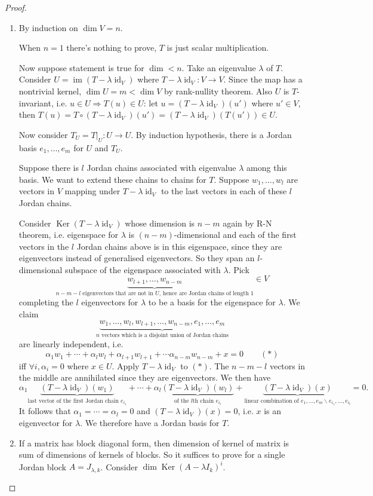 \documentclass[a4paper]{article}
\newcommand{\Ker}{\operatorname{Ker}}
\newcommand{\id}{\operatorname{id}}
\newcommand{\im}{\operatorname{im}}
\theoremstyle{definition}
\begin{document}
\begin{proof}
\begin{enumerate}
    \item By induction on $\dim V=n$.
    
    When $n=1$ there's nothing to prove, $T$ is just scalar multiplication.
    
    Now suppose statement is true for $\dim < n$. Take an eigenvalue $\lambda$ of $T$. Consider $U=\im (T-\lambda \id_V)$ where $T-\lambda \id_V:V\rightarrow V$. Since the map has a nontrivial kernel, $\dim U=m<\dim V$ by rank-nullity theorem. Also $U$ is $T$-invariant, i.e. $u\in U \Rightarrow T(u)\in U$: let $u=(T-\lambda \id_V)(u')$ where $u' \in V$, then $T(u)=T\circ (T-\lambda \id_V)(u')=(T-\lambda \id_V) (T(u')) \in U$.
    
    Now consider $T_U=\left. T \right|_U : U\rightarrow U$. By induction hypothesis, there is a Jordan basis $e_1,\ldots,e_m$ for $U$ and $T_U$.
    
    Suppose there is $l$ Jordan chains associated with eigenvalue $\lambda$ among this basis. We want to extend these chains to chains for $T$. Suppose $w_1,\ldots,w_l$ are vectors in $V$ mapping under $T-\lambda \id_V$ to the last vectors in each of these $l$ Jordan chains.
    
    Consider $\Ker (T-\lambda \id_V)$ whose dimension is $n-m$ again by R-N theorem, i.e. eigenspace for $\lambda$ is $(n-m)$-dimensional and each of the first vectors in the $l$ Jordan chains above is in this eigenspace, since they are eigenvectors instead of generalised eigenvectors. So they span an $l$-dimensional subspace of the eigenspace associated with $\lambda$. Pick
\[
\underbrace{w_{l+1},\ldots,w_{n-m}}_{n-m-l\text{ eigenvectors that are not in }U\text{, hence are Jordan chains of length 1}} \in V
\]
completing the $l$ eigenvectors for $\lambda$ to be a basis for the eigenspace for $\lambda$. We claim
\[
\underbrace{w_1,\ldots,w_l,w_{l+1},\ldots,w_{n-m},e_1,\ldots,e_m}_{n\text{ vectors which is a disjoint union of Jordan chains}}
\]
are linearly independent, i.e.
\[
\alpha_1 w_1+\cdots+\alpha_l w_l+\alpha_{l+1} w_{l+1}+\cdots \alpha_{n-m} w_{n-m}+x=0\qquad (\ast)
\]
iff $\forall i, \alpha_i=0$ where $x\in U$. Apply $T-\lambda \id _V$ to $(\ast)$. The $n-m-l$ vectors in the middle are annihilated since they are eigenvectors. We then have
\[
\alpha_1 \underbrace{(T-\lambda \id_V)(w_1)}_{\text{last vector of the first Jordan chain } e_{i_1}}+\cdots+\alpha_l \underbrace{(T-\lambda \id_V)(w_l)}_{\text{of the }l\text{th chain } e_{i_l}}+\underbrace{(T-\lambda \id_V)(x)}_{\text{linear combination of }e_1,\ldots,e_m \backslash e_{i_1},\ldots,e_{i_l}}=0 .
\]
It follows that $\alpha_1=\cdots=\alpha_l=0$ and $(T-\lambda \id_V)(x)=0$, i.e. $x$ is an eigenvector for $\lambda$. We therefore have a Jordan basis for $T$.
    \item If a matrix has block diagonal form, then dimension of kernel of matrix is sum of dimensions of kernels of blocks. So it suffices to prove for a single Jordan block $A = J_{\lambda,k}$. Consider $\dim \Ker (A-\lambda I_k)^i$.
    

\end{enumerate}
\end{proof}
\end{document}
